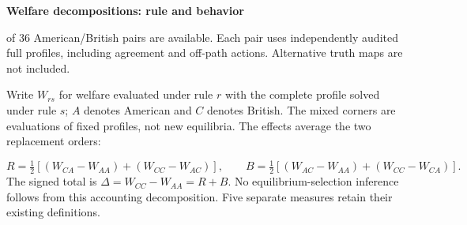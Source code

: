 \documentclass[10pt]{article}
\begin{document}
{\LARGE\bfseries Welfare decompositions: rule and behavior}\par{} of 36 American/British pairs are available. Each pair uses independently audited full profiles, including agreement and off-path actions. Alternative truth maps are not included.\par\smallskip
Write $W_{rs}$ for welfare evaluated under rule $r$ with the complete profile solved under rule $s$; $A$ denotes American and $C$ denotes British. The mixed corners are evaluations of fixed profiles, not new equilibria. The effects average the two replacement orders:\par
\[R=\tfrac12[(W_{CA}-W_{AA})+(W_{CC}-W_{AC})],\qquad B=\tfrac12[(W_{AC}-W_{AA})+(W_{CC}-W_{CA})].\]
The signed total is $\Delta=W_{CC}-W_{AA}=R+B$. No equilibrium-selection inference follows from this accounting decomposition. Five separate measures retain their existing definitions.\par\medskip
\end{document}
